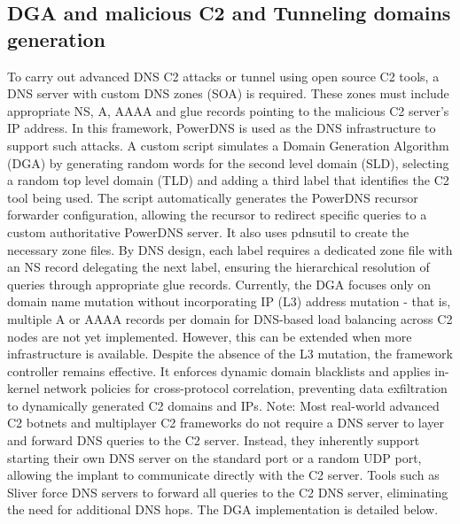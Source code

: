 \documentclass [11pt, proquest] {uwthesis}[2020/02/24]
\begin{document}
\subsection{DGA and malicious C2 and Tunneling domains generation}
To carry out advanced DNS C2 attacks or tunnel using open source C2 tools, a DNS server with custom DNS zones (SOA) is required. These zones must include appropriate NS, A, AAAA and glue records pointing to the malicious C2 server’s IP address. In this framework, PowerDNS is used as the DNS infrastructure to support such attacks. A custom script simulates a Domain Generation Algorithm (DGA) by generating random words for the second level domain (SLD), selecting a random top level domain (TLD) and adding a third label that identifies the C2 tool being used. The script automatically generates the PowerDNS recursor forwarder configuration, allowing the recursor to redirect specific queries to a custom authoritative PowerDNS server. It also uses pdnsutil to create the necessary zone files. By DNS design, each label requires a dedicated zone file with an NS record delegating the next label, ensuring the hierarchical resolution of queries through appropriate glue records. Currently, the DGA focuses only on domain name mutation without incorporating IP (L3) address mutation - that is, multiple A or AAAA records per domain for DNS-based load balancing across C2 nodes are not yet implemented. However, this can be extended when more infrastructure is available. Despite the absence of the L3 mutation, the framework controller remains effective. It enforces dynamic domain blacklists and applies in-kernel network policies for cross-protocol correlation, preventing data exfiltration to dynamically generated C2 domains and IPs. Note: Most real-world advanced C2 botnets and multiplayer C2 frameworks do not require a DNS server to layer and forward DNS queries to the C2 server. Instead, they inherently support starting their own DNS server on the standard port or a random UDP port, allowing the implant to communicate directly with the C2 server. Tools such as Sliver force DNS servers to forward all queries to the C2 DNS server, eliminating the need for additional DNS hops.
The DGA implementation is detailed below.
\end{document}
